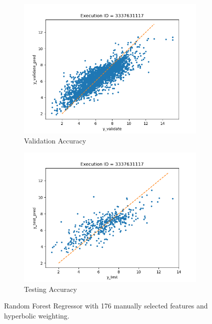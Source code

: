 \documentclass[11pt]{article}
\begin{document}
\begin{figure}
     \centering
     \begin{subfigure}[b]{0.45\textwidth}
         \centering
         \includegraphics[scale=0.45]{images/accuracyRFRvalidate}
         \caption{Validation Accuracy}
        \label{fig:accuracyRFRvalidate}
     \end{subfigure}
     \hfill
     \begin{subfigure}[b]{0.45\textwidth}
         \centering
         \includegraphics[scale=0.45]{images/accuracyRFRtest}
        \caption{Testing Accuracy}
        \label{fig:accuracyRFRtest}
     \end{subfigure}
     \caption{Random Forest Regressor with 176 manually selected features and hyperbolic weighting.}
     \label{fig:RFMModel}
\end{figure}
\end{document}
